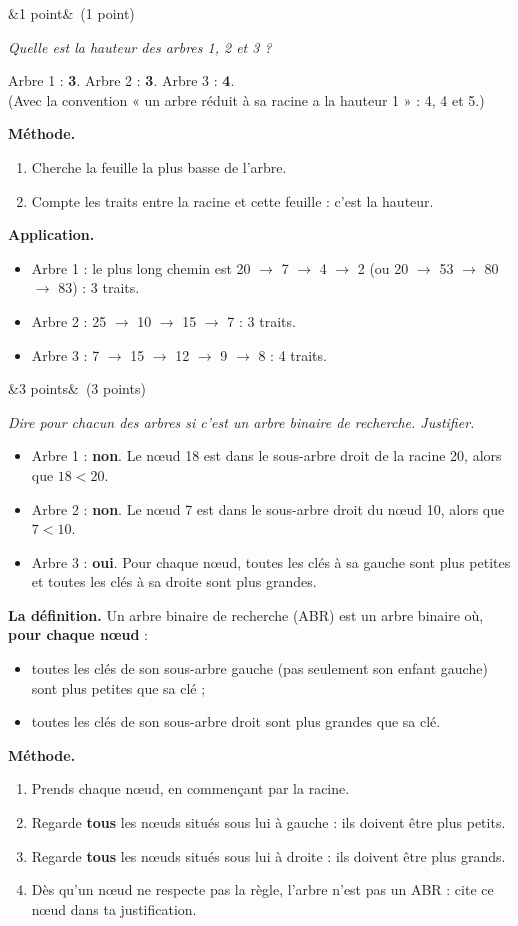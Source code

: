 \documentclass[11pt, a4paper]{exam}
\newcommand{\Q}[3]{\par\needspace{5\baselineskip}\bigskip\noindent{\large\bfseries Question #1}\ifx&#2&\else\ \textnormal{(#2)}\fi\par\nopagebreak\smallskip\noindent\textit{#3}\par\nopagebreak\smallskip}
\newcommand{\methode}{\par\noindent\textbf{Méthode.}\ }
\newcommand{\application}{\par\noindent\textbf{Application.}\ }
\begin{document}
\Q{5}{1 point}{Quelle est la hauteur des arbres 1, 2 et 3 ?}
\begin{reponse}
Arbre 1 : \textbf{3}. \qquad Arbre 2 : \textbf{3}. \qquad Arbre 3 : \textbf{4}. \\
\small(Avec la convention « un arbre réduit à sa racine a la hauteur 1 » : 4, 4 et 5.)
\end{reponse}
\methode
\begin{enumerate}
\item Cherche la feuille la plus basse de l'arbre.
\item Compte les traits entre la racine et cette feuille : c'est la hauteur.
\end{enumerate}
\application
\begin{itemize}
\item Arbre 1 : le plus long chemin est 20 $\to$ 7 $\to$ 4 $\to$ 2 (ou 20 $\to$ 53 $\to$ 80 $\to$ 83) : 3 traits.
\item Arbre 2 : 25 $\to$ 10 $\to$ 15 $\to$ 7 : 3 traits.
\item Arbre 3 : 7 $\to$ 15 $\to$ 12 $\to$ 9 $\to$ 8 : 4 traits.
\end{itemize}

\Q{6}{3 points}{Dire pour chacun des arbres si c'est un arbre binaire de recherche. Justifier.}
\begin{reponse}
\begin{itemize}
\item Arbre 1 : \textbf{non}. Le nœud 18 est dans le sous-arbre droit de la racine 20, alors que $18 < 20$.
\item Arbre 2 : \textbf{non}. Le nœud 7 est dans le sous-arbre droit du nœud 10, alors que $7 < 10$.
\item Arbre 3 : \textbf{oui}. Pour chaque nœud, toutes les clés à sa gauche sont plus petites et toutes les clés à sa droite sont plus grandes.
\end{itemize}
\end{reponse}
\textbf{La définition.} Un arbre binaire de recherche (ABR) est un arbre binaire où, \textbf{pour chaque nœud} :
\begin{itemize}
\item toutes les clés de son sous-arbre gauche (pas seulement son enfant gauche) sont plus petites que sa clé ;
\item toutes les clés de son sous-arbre droit sont plus grandes que sa clé.
\end{itemize}
\methode
\begin{enumerate}
\item Prends chaque nœud, en commençant par la racine.
\item Regarde \textbf{tous} les nœuds situés sous lui à gauche : ils doivent être plus petits.
\item Regarde \textbf{tous} les nœuds situés sous lui à droite : ils doivent être plus grands.
\item Dès qu'un nœud ne respecte pas la règle, l'arbre n'est pas un ABR : cite ce nœud dans ta justification.
\end{enumerate}
\end{document}
